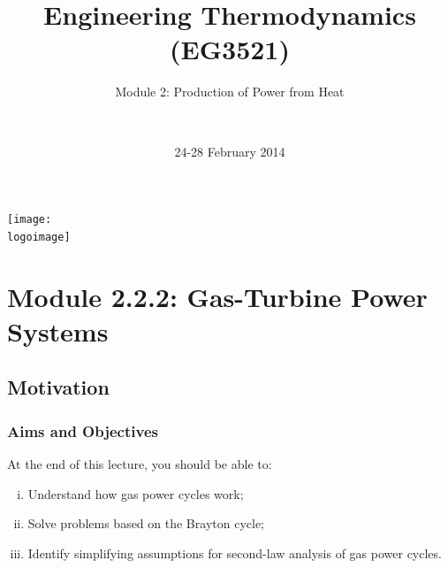 \documentclass[10pt,compress]{beamer}
\institute{School of Engineering}
\title{Engineering Thermodynamics (EG3521)}
\subtitle{Module 2: Production of Power from Heat}
\date[24-28/02/2014]{24-28 February 2014}
\author[\shortname]{%
  \fullname\\\ttfamily{\emailaddress}
}
\newcommand{\logoimage}{../FigBanner/UoAHorizBanner}
\begin{document}
\begin{frame}
  \titlepage
  \vfill%
  \begin{center}
    \texttt{[image: \\logoimage]}
  \end{center}
\end{frame}




\section{Module 2.2.2: Gas-Turbine Power Systems}

\subsection{Motivation}
\begin{frame}
 \frametitle{Aims and Objectives}
 At the end of this lecture, you should be able to:
 \begin{enumerate}[(i)]
  \item <1-> Understand how gas power cycles work;
  \item <2-> Solve problems based on the Brayton cycle;
  \item <3-> Identify simplifying assumptions for second-law analysis of gas power cycles.
 \end{enumerate}
\end{frame}

 
\end{document}
